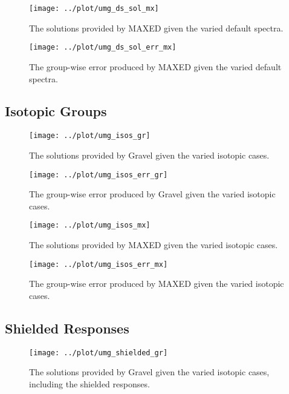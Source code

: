 \documentclass[journal]{IEEEtran}
\begin{document}
\begin{figure}[h!tb]
  \centering
  \texttt{[image: ../plot/umg\_ds\_sol\_mx]}
  \caption{The solutions provided by MAXED given the varied default spectra.}
  \label{fig:ds_sol_mx}
\end{figure}

\begin{figure}[h!tb]
  \centering
  \texttt{[image: ../plot/umg\_ds\_sol\_err\_mx]}
  \caption{The group-wise error produced by MAXED given the varied default spectra.}
  \label{fig:ds_err_mx}
\end{figure}


\subsection{Isotopic Groups}



\begin{figure}[h!tb]
  \centering
  \texttt{[image: ../plot/umg\_isos\_gr]}
  \caption{The solutions provided by Gravel given the varied isotopic cases.}
  \label{fig:isos_gr}
\end{figure}

\begin{figure}[h!tb]
  \centering
  \texttt{[image: ../plot/umg\_isos\_err\_gr]}
  \caption{The group-wise error produced by Gravel given the varied isotopic cases.}
  \label{fig:isos_err_gr}
\end{figure}

\begin{figure}[h!tb]
  \centering
  \texttt{[image: ../plot/umg\_isos\_mx]}
  \caption{The solutions provided by MAXED given the varied  isotopic cases.}
  \label{fig:isos_mx}
\end{figure}

\begin{figure}[h!tb]
  \centering
  \texttt{[image: ../plot/umg\_isos\_err\_mx]}
  \caption{The group-wise error produced by MAXED given the varied  isotopic cases.}
  \label{fig:isos_err_mx}
\end{figure}

\subsection{Shielded Responses}

\begin{figure}[h!tb]
  \centering
  \texttt{[image: ../plot/umg\_shielded\_gr]}
  \caption{The solutions provided by Gravel given the varied isotopic cases, including the shielded responses.}
  \label{fig:shielded_gr}
\end{figure}
\end{document}
